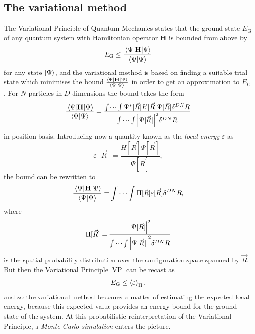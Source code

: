 \documentclass[a4paper,8pt]{article}
\begin{document}
\begin{multicols}{2}
\subsection{The variational method} \label{varmethod}
The Variational Principle of Quantum Mechanics states that the ground state $E_\text{G}$ of any quantum system with Hamiltonian operator $\mathbf{H}$ is bounded from above by
\begin{equation}\label{VP}
E_\text{G} \leq \frac{\ev{\mathbf{H}}{\Psi}}{\braket{\Psi}{\Psi}}
\end{equation}
for any state $\ket{\Psi}$, and the variational method is based on finding a suitable trial state which minimises the bound $\frac{\ev{\mathbf{H}}{\Psi}}{\braket{\Psi}{\Psi}}$ in order to get an approximation to $E_\text{G}$. For $N$ particles in $D$ dimensions the bound takes the form
\begin{align}
\frac{\ev{\mathbf{H}}{\Psi}}{\braket{\Psi}{\Psi}} = \frac{\idotsint \Psi^*[\vec{R}]H[\vec{R}]\Psi[\vec{R}]\delta^{DN}R}{\idotsint \abs{\Psi[\vec{R}]}^2\delta^{DN}R} \nonumber
\end{align}
in position basis. Introducing now a quantity known as the \textit{local energy} $\varepsilon$ as
\begin{equation}\label{localenergy}
\varepsilon[\vec{R}] = \frac{H[\vec{R}]\Psi[\vec{R}]}{\Psi[\vec{R}]},
\end{equation}
the bound can be rewritten to
\begin{equation}
\frac{\ev{\mathbf{H}}{\Psi}}{\braket{\Psi}{\Psi}} = \idotsint \Pi[\vec{R}]\varepsilon[\vec{R}] \delta^{DN}R, \nonumber
\end{equation}
where
\begin{equation}\label{distribution}
\Pi[\vec{R}] = \frac{\abs{\Psi[\vec{R}]}^2}{\idotsint \abs{\Psi[\vec{R}]}^2\delta^{DN}R} 
\end{equation}
is the spatial probability distribution over the configuration space spanned by $\vec{R}$. But then the Variational Principle \eqref{VP} can be recast as
\begin{equation}
E_\text{G} \leq \ev{\varepsilon}_\Pi,
\end{equation}
and so the variational method becomes a matter of estimating the expected local energy, because this expected value provides an energy bound for the ground state of the system. At this probabilistic reinterpretation of the Variational Principle, a \textit{Monte Carlo simulation} enters the picture.


\end{multicols}
\end{document}
